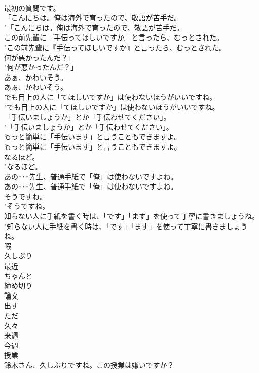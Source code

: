 \documentclass[8pt]{extreport}
\begin{document}
\begin{CJK}{UTF8}{min}
\\	最初の質問です。 
\\	「こんにちは。俺は海外で育ったので、敬語が苦手だ。	
\\	"「こんにちは。俺は海外で育ったので、敬語が苦手だ。 
\\	この前先輩に『手伝ってほしいですか』と言ったら、むっとされた。	
\\	"この前先輩に『手伝ってほしいですか』と言ったら、むっとされた。 
\\	何が悪かったんだ？」	
\\	"何が悪かったんだ？」 
\\	あぁ、かわいそう。	
\\	あぁ、かわいそう。 
\\	でも目上の人に「てほしいですか」は使わないほうがいいですね。	
\\	"でも目上の人に「てほしいですか」は使わないほうがいいですね。 
\\	「手伝いましょうか」とか「手伝わせてください」。	
\\	"「手伝いましょうか」とか「手伝わせてください」。 
\\	もっと簡単に「手伝います」と言うこともできますよ。	
\\	もっと簡単に「手伝います」と言うこともできますよ。 
\\	なるほど。	
\\	"なるほど。 
\\	あの･･･先生、普通手紙で「俺」は使わないですよね。	
\\	あの･･･先生、普通手紙で「俺」は使わないですよね。 
\\	そうですね。	
\\	"そうですね。 
\\	知らない人に手紙を書く時は、「です」「ます」を使って丁寧に書きましょうね。	
\\	"知らない人に手紙を書く時は、「です」「ます」を使って丁寧に書きましょうね。 
\\	暇
\\	久しぶり
\\	最近
\\	ちゃんと
\\	締め切り
\\	論文
\\	出す
\\	ただ
\\	久々
\\	来週
\\	今週
\\	授業
\\	鈴木さん、久しぶりですね。この授業は嫌いですか？	

\end{CJK}
\end{document}

